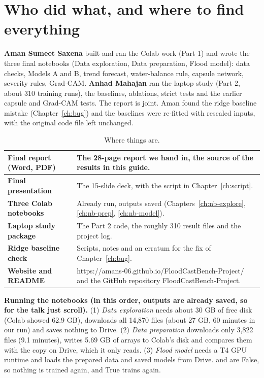 \section{Who did what, and where to find everything}\label{ch:who}
\textbf{Aman Sumeet Saxena} built and ran the Colab work (Part 1) and wrote the three final notebooks (Data exploration, Data preparation, Flood model): data checks, Models A and B, trend forecast, water-balance rule, capsule network, severity rules, Grad-CAM. \textbf{Anhad Mahajan} ran the laptop study (Part 2, about 310 training runs), the baselines, ablations, strict tests and the earlier capsule and Grad-CAM tests. The report is joint. Aman found the ridge baseline mistake (Chapter~\ref{ch:bug}) and the baselines were re-fitted with rescaled inputs, with the original code file left unchanged.

\begin{table}[!htbp]
\centering\footnotesize
\caption{Where things are.}
\begin{tabularx}{\linewidth}{|>{\bfseries}p{3.6cm}|Y|}
\hline
Final report (Word, PDF) & The 28-page report we hand in, the source of the results in this guide.\\ \hline
Final presentation & The 15-slide deck, with the script in Chapter~\ref{ch:script}.\\ \hline
Three Colab notebooks & Already run, outputs saved (Chapters~\ref{ch:nb-explore}, \ref{ch:nb-prep}, \ref{ch:nb-model}).\\ \hline
Laptop study package & The Part 2 code, the roughly 310 result files and the project log.\\ \hline
Ridge baseline check & Scripts, notes and an erratum for the fix of Chapter~\ref{ch:bug}.\\ \hline
Website and README & https://amans-06.github.io/FloodCastBench-Project/ and the GitHub repository FloodCastBench-Project.\\ \hline
\end{tabularx}
\end{table}

\textbf{Running the notebooks (in this order, outputs are already saved, so for the talk just scroll).} (1) \emph{Data exploration} needs about 30 GB of free disk (Colab showed 62.9 GB), downloads all 14,870 files (about 27 GB, 60 minutes in our run) and saves nothing to Drive. (2) \emph{Data preparation} downloads only 3,822 files (9.1 minutes), writes 5.69 GB of arrays to Colab's disk and compares them with the copy on Drive, which it only reads. (3) \emph{Flood model} needs a T4 GPU runtime and loads the prepared data and saved models from Drive.  and  are False, so nothing is trained again, and True trains again.
